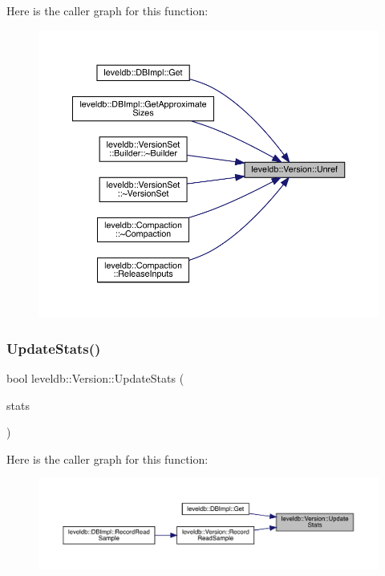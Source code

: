 Here is the caller graph for this function\+:
\nopagebreak
\begin{figure}[H]
\begin{center}
\leavevmode
\includegraphics[width=350pt]{classleveldb_1_1_version_a3f623697f625d4740d5b273c0bf6223a_icgraph}
\end{center}
\end{figure}
\mbox{\label{classleveldb_1_1_version_a7e5b8451deb7c4b9006fd9d5ccfc2cef}} 
\subsubsection{\texorpdfstring{UpdateStats()}{UpdateStats()}}
{\footnotesize\ttfamily bool leveldb\+::\+Version\+::\+Update\+Stats (\begin{DoxyParamCaption}\item[{const \mbox{\hyperlink{structleveldb_1_1_version_1_1_get_stats}{Get\+Stats}} \&}]{stats }\end{DoxyParamCaption})}

Here is the caller graph for this function\+:
\nopagebreak
\begin{figure}[H]
\begin{center}
\leavevmode
\includegraphics[width=350pt]{classleveldb_1_1_version_a7e5b8451deb7c4b9006fd9d5ccfc2cef_icgraph}
\end{center}
\end{figure}


